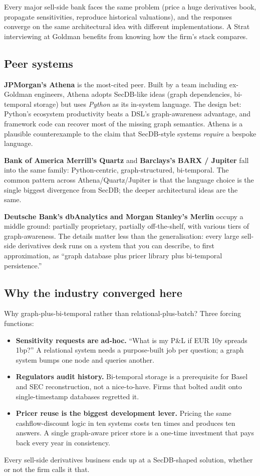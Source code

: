 Every major sell-side bank faces the same problem (price a
huge derivatives book, propagate sensitivities, reproduce
historical valuations), and the responses converge on the same
architectural idea with different implementations.  A Strat
interviewing at Goldman benefits from knowing how the firm's
stack compares.

\subsection{Peer systems}

\textbf{JPMorgan's Athena} is the most-cited peer.  Built by a
team including ex-Goldman engineers, Athena adopts SecDB-like
ideas (graph dependencies, bi-temporal storage) but uses
\emph{Python} as its in-system language.  The design bet: Python's
ecosystem productivity beats a DSL's graph-awareness advantage,
and framework code can recover most of the missing graph
semantics.  Athena is a plausible counterexample to the claim
that SecDB-style systems \emph{require} a bespoke language.

\textbf{Bank of America Merrill's Quartz} and \textbf{Barclays's
BARX / Jupiter} fall into the same family: Python-centric,
graph-structured, bi-temporal.  The common pattern across
Athena/Quartz/Jupiter is that the language choice is the single
biggest divergence from SecDB; the deeper architectural ideas are
the same.

\textbf{Deutsche Bank's dbAnalytics and Morgan Stanley's Merlin}
occupy a middle ground: partially proprietary, partially
off-the-shelf, with various tiers of graph-awareness.  The details
matter less than the generalisation: every large sell-side
derivatives desk runs on a system that you can describe, to first
approximation, as ``graph database plus pricer library plus
bi-temporal persistence.''

\subsection{Why the industry converged here}

Why graph-plus-bi-temporal rather than relational-plus-batch?
Three forcing functions:
\begin{itemize}
  \item \textbf{Sensitivity requests are ad-hoc.}  ``What is my
    P\&L if EUR 10y spreads 1bp?''  A relational system needs
    a purpose-built job per question; a graph system bumps one
    node and queries another.
  \item \textbf{Regulators audit history.}  Bi-temporal storage is
    a prerequisite for Basel and SEC reconstruction, not a
    nice-to-have.  Firms that bolted audit onto single-timestamp
    databases regretted it.
  \item \textbf{Pricer reuse is the biggest development lever.}
    Pricing the same cashflow-discount logic in ten systems costs
    ten times and produces ten answers.  A single graph-aware
    pricer store is a one-time investment that pays back every
    year in consistency.
\end{itemize}
Every sell-side derivatives business ends up at a SecDB-shaped
solution, whether or not the firm calls it that.

